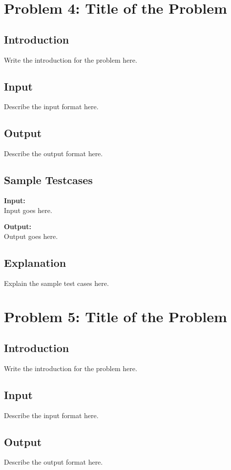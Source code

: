 \documentclass[12pt]{article}
\begin{document}
\newpage

\section*{Problem 4: Title of the Problem}

\subsection*{Introduction}
Write the introduction for the problem here.

\subsection*{Input}
Describe the input format here.

\subsection*{Output}
Describe the output format here.

\subsection*{Sample Testcases}
\textbf{Input:} \\
Input goes here.

\textbf{Output:} \\
Output goes here.

\subsection*{Explanation}
Explain the sample test cases here.

\newpage

\section*{Problem 5: Title of the Problem}

\subsection*{Introduction}
Write the introduction for the problem here.

\subsection*{Input}
Describe the input format here.

\subsection*{Output}
Describe the output format here.
\end{document}
